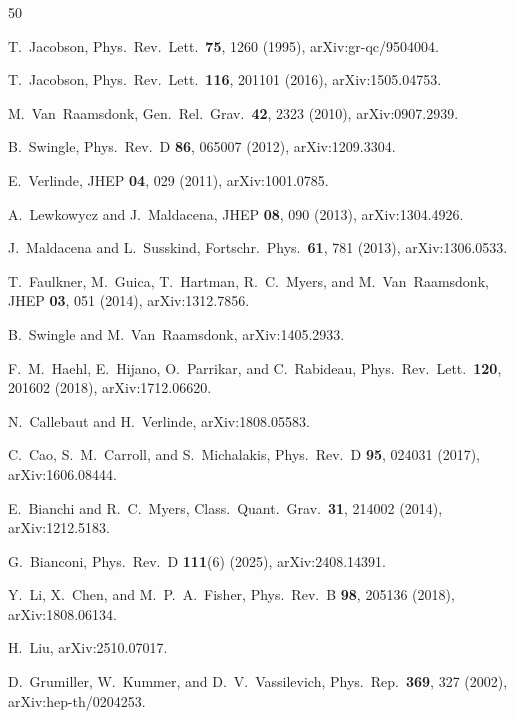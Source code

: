 \documentclass[aps,prd,twocolumn,superscriptaddress,nofootinbib,floatfix]{revtex4-2}
\begin{document}
\begin{thebibliography}{50}

T.~Jacobson, Phys.\ Rev.\ Lett.\ \textbf{75}, 1260 (1995), arXiv:gr-qc/9504004.

T.~Jacobson, Phys.\ Rev.\ Lett.\ \textbf{116}, 201101 (2016), arXiv:1505.04753.

M.~Van~Raamsdonk, Gen.\ Rel.\ Grav.\ \textbf{42}, 2323 (2010), arXiv:0907.2939.

B.~Swingle, Phys.\ Rev.\ D \textbf{86}, 065007 (2012), arXiv:1209.3304.

E.~Verlinde, JHEP \textbf{04}, 029 (2011), arXiv:1001.0785.

A.~Lewkowycz and J.~Maldacena, JHEP \textbf{08}, 090 (2013), arXiv:1304.4926.

J.~Maldacena and L.~Susskind, Fortschr.\ Phys.\ \textbf{61}, 781 (2013), arXiv:1306.0533.

T.~Faulkner, M.~Guica, T.~Hartman, R.~C.~Myers, and M.~Van~Raamsdonk, JHEP \textbf{03}, 051 (2014), arXiv:1312.7856.

B.~Swingle and M.~Van~Raamsdonk, arXiv:1405.2933.

F.~M.~Haehl, E.~Hijano, O.~Parrikar, and C.~Rabideau, Phys.\ Rev.\ Lett.\ \textbf{120}, 201602 (2018), arXiv:1712.06620.

N.~Callebaut and H.~Verlinde, arXiv:1808.05583.

C.~Cao, S.~M.~Carroll, and S.~Michalakis, Phys.\ Rev.\ D \textbf{95}, 024031 (2017), arXiv:1606.08444.

E.~Bianchi and R.~C.~Myers, Class.\ Quant.\ Grav.\ \textbf{31}, 214002 (2014), arXiv:1212.5183.

G.~Bianconi, Phys.\ Rev.\ D \textbf{111}(6) (2025), arXiv:2408.14391.

Y.~Li, X.~Chen, and M.~P.~A.~Fisher, Phys.\ Rev.\ B \textbf{98}, 205136 (2018), arXiv:1808.06134.

H.~Liu, arXiv:2510.07017.

D.~Grumiller, W.~Kummer, and D.~V.~Vassilevich, Phys.\ Rep.\ \textbf{369}, 327 (2002), arXiv:hep-th/0204253.


\end{thebibliography}
\end{document}
